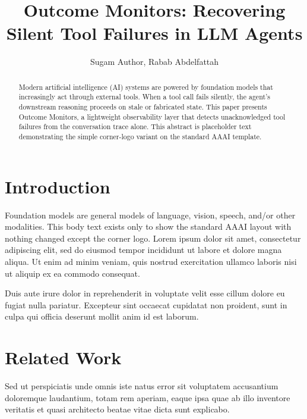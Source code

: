 \documentclass[letterpaper]{article}
\title{Outcome Monitors: Recovering Silent Tool Failures in LLM Agents}
\author{Sugam Author, Rabab Abdelfattah\\}
\begin{document}
\aimscornerlogo
\maketitle

\begin{abstract}
Modern artificial intelligence (AI) systems are powered by foundation models
that increasingly act through external tools. When a tool call fails
silently, the agent's downstream reasoning proceeds on stale or fabricated
state. This paper presents Outcome Monitors, a lightweight observability
layer that detects unacknowledged tool failures from the conversation trace
alone. This abstract is placeholder text demonstrating the simple corner-logo
variant on the standard AAAI template.
\end{abstract}

\section{Introduction}

Foundation models are general models of language, vision, speech, and/or
other modalities. This body text exists only to show the standard AAAI layout
with nothing changed except the corner logo. Lorem ipsum dolor sit amet,
consectetur adipiscing elit, sed do eiusmod tempor incididunt ut labore et
dolore magna aliqua. Ut enim ad minim veniam, quis nostrud exercitation
ullamco laboris nisi ut aliquip ex ea commodo consequat.

Duis aute irure dolor in reprehenderit in voluptate velit esse cillum dolore
eu fugiat nulla pariatur. Excepteur sint occaecat cupidatat non proident,
sunt in culpa qui officia deserunt mollit anim id est laborum.

\section{Related Work}

Sed ut perspiciatis unde omnis iste natus error sit voluptatem accusantium
doloremque laudantium, totam rem aperiam, eaque ipsa quae ab illo inventore
veritatis et quasi architecto beatae vitae dicta sunt explicabo.
\end{document}
